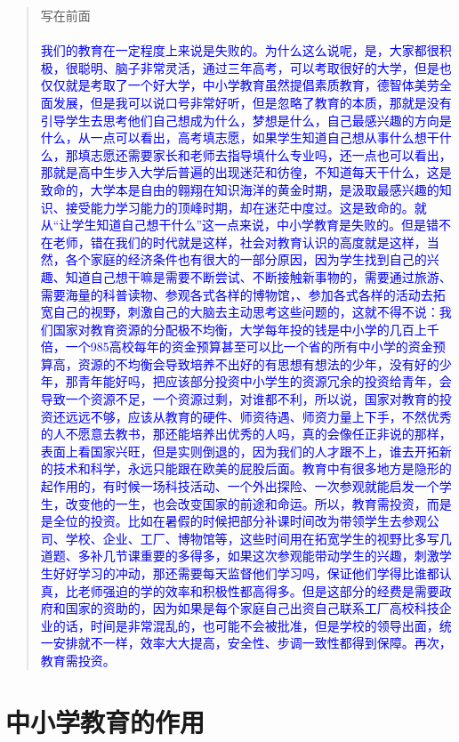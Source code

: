 \documentclass[utf8]{book}
\begin{document}
\begin{quotation}
	{\huge 写在前面}\\ \\
	\textcolor{blue}{\indent
		 我们的教育在一定程度上来说是失败的。为什么这么说呢，是，大家都很积极，很聪明、脑子非常灵活，通过三年高考，可以考取很好的大学，但是也仅仅就是考取了一个好大学，中小学教育虽然提倡素质教育，德智体美劳全面发展，但是我可以说口号非常好听，但是忽略了教育的本质，那就是没有引导学生去思考他们自己想成为什么，梦想是什么，自己最感兴趣的方向是什么，从一点可以看出，高考填志愿，如果学生知道自己想从事什么想干什么，那填志愿还需要家长和老师去指导填什么专业吗，还一点也可以看出，那就是高中生步入大学后普遍的出现迷茫和彷徨，不知道每天干什么，这是致命的，大学本是自由的翱翔在知识海洋的黄金时期，是汲取最感兴趣的知识、接受能力学习能力的顶峰时期，却在迷茫中度过。这是致命的。就从“让学生知道自己想干什么”这一点来说，中小学教育是失败的。但是错不在老师，错在我们的时代就是这样，社会对教育认识的高度就是这样，当然，各个家庭的经济条件也有很大的一部分原因，因为学生找到自己的兴趣、知道自己想干嘛是需要不断尝试、不断接触新事物的，需要通过旅游、需要海量的科普读物、参观各式各样的博物馆，、参加各式各样的活动去拓宽自己的视野，刺激自己的大脑去主动思考这些问题的，这就不得不说：我们国家对教育资源的分配极不均衡，大学每年投的钱是中小学的几百上千倍，一个985高校每年的资金预算甚至可以比一个省的所有中小学的资金预算高，资源的不均衡会导致培养不出好的有思想有想法的少年，没有好的少年，那青年能好吗，把应该部分投资中小学生的资源冗余的投资给青年，会导致一个资源不足，一个资源过剩，对谁都不利，所以说，国家对教育的投资还远远不够，应该从教育的硬件、师资待遇、师资力量上下手，不然优秀的人不愿意去教书，那还能培养出优秀的人吗，真的会像任正非说的那样，表面上看国家兴旺，但是实则倒退的，因为我们的人才跟不上，谁去开拓新的技术和科学，永远只能跟在欧美的屁股后面。教育中有很多地方是隐形的起作用的，有时候一场科技活动、一个外出探险、一次参观就能启发一个学生，改变他的一生，也会改变国家的前途和命运。所以，教育需投资，而是是全位的投资。比如在暑假的时候把部分补课时间改为带领学生去参观公司、学校、企业、工厂、博物馆等，这些时间用在拓宽学生的视野比多写几道题、多补几节课重要的多得多，如果这次参观能带动学生的兴趣，刺激学生好好学习的冲动，那还需要每天监督他们学习吗，保证他们学得比谁都认真，比老师强迫的学的效率和积极性都高得多。但是这部分的经费是需要政府和国家的资助的，因为如果是每个家庭自己出资自己联系工厂高校科技企业的话，时间是非常混乱的，也可能不会被批准，但是学校的领导出面，统一安排就不一样，效率大大提高，安全性、步调一致性都得到保障。再次，教育需投资。}
\end{quotation}

\chapter{中小学教育的作用}
\end{document}
